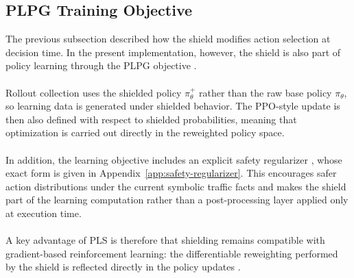 \subsection{PLPG Training Objective}
The previous subsection described how the shield modifies action selection at decision time. In the present implementation, however, the shield is also part of policy learning through the PLPG objective \cite{yang2023safereinforcementlearningprobabilistic}.
\\
\\
Rollout collection uses the shielded policy \(\pi_\theta^+\) rather than the raw base policy \(\pi_\theta\), so learning data is generated under shielded behavior. The PPO-style update is then also defined with respect to shielded probabilities, meaning that optimization is carried out directly in the reweighted policy space.
\\
\\
In addition, the learning objective includes an explicit safety regularizer \cite{yang2023safereinforcementlearningprobabilistic}, whose exact form is given in Appendix~\ref{app:safety-regularizer}. This encourages safer action distributions under the current symbolic traffic facts and makes the shield part of the learning computation rather than a post-processing layer applied only at execution time.
\\
\\
A key advantage of PLS is therefore that shielding remains compatible with gradient-based reinforcement learning: the differentiable reweighting performed by the shield is reflected directly in the policy updates \cite{yang2023safereinforcementlearningprobabilistic,minihackexp}.

